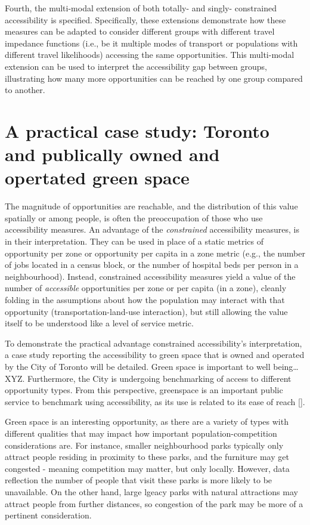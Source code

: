 \documentclass[
11pt, %
oneside, %
english, %
singlespacing, %
]{macthesis} %
\begin{document}
Fourth, the multi-modal extension of both totally- and singly- constrained accessibility is specified. Specifically, these extensions demonstrate how these measures can be adapted to consider different groups with different travel impedance functions (i.e., be it multiple modes of transport or populations with different travel likelihoods) accessing the same opportunities. This multi-modal extension can be used to interpret the accessibility gap between groups, illustrating how many more opportunities can be reached by one group compared to another.

\section{A practical case study: Toronto and publically owned and opertated green space}\label{a-practical-case-study-toronto-and-publically-owned-and-opertated-green-space}

The magnitude of opportunities are reachable, and the distribution of this value spatially or among people, is often the preoccupation of those who use accessibility measures. An advantage of the \emph{constrained} accessibility measures, is in their interpretation. They can be used in place of a static metrics of opportunity per zone or opportunity per capita in a zone metric (e.g., the number of jobs located in a census block, or the number of hospital beds per person in a neighbourhood). Instead, constrained accessibility measures yield a value of the number of \emph{accessible} opportunities per zone or per capita (in a zone), cleanly folding in the assumptions about how the population may interact with that opportunity (transportation-land-use interaction), but still allowing the value itself to be understood like a level of service metric.

To demonstrate the practical advantage constrained accessibility's interpretation, a case study reporting the accessibility to green space that is owned and operated by the City of Toronto will be detailed. Green space is important to well being\ldots{} XYZ. Furthermore, the City is undergoing benchmarking of access to different opportunity types. From this perspective, greenspace is an important public service to benchmark using accessibility, as its use is related to its ease of reach {[}{]}.

Green space is an interesting opportunity, as there are a variety of types with different qualities that may impact how important population-competition considerations are. For instance, smaller neighbourhood parks typically only attract people residing in proximity to these parks, and the furniture may get congested - meaning competition may matter, but only locally. However, data reflection the number of people that visit these parks is more likely to be unavailable. On the other hand, large lgeacy parks with natural attractions may attract people from further distances, so congestion of the park may be more of a pertinent consideration.
\end{document}
